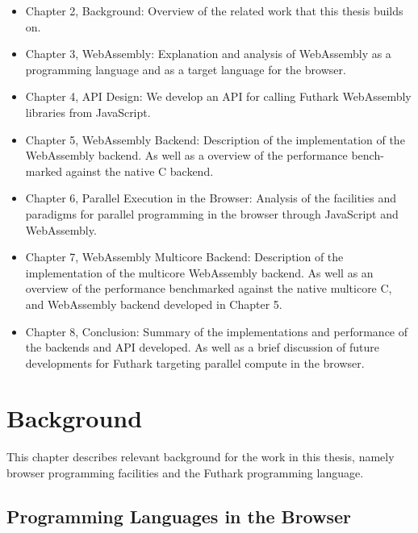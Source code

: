 \documentclass[11pt]{book}
\begin{document}
\begin{itemize}

\item Chapter 2, Background:
    Overview of the related work that this thesis builds on.

\item Chapter 3, WebAssembly:
    Explanation and analysis of WebAssembly as a programming language and as a target language for the browser. 

\item Chapter 4, API Design:
    We develop an API for calling Futhark Web\-Assembly libraries from JavaScript. 

\item Chapter 5, WebAssembly Backend:
    Description of the implementation of the WebAssembly backend. As well as a overview of the performance bench-marked against the native C backend.
    
\item Chapter 6, Parallel Execution in the Browser:
    Analysis of the facilities and paradigms for parallel programming in the browser through JavaScript and WebAssembly. 
    
\item Chapter 7, WebAssembly Multicore Backend:
    Description of the implementation of the multicore WebAssembly backend. As well as an overview of the performance benchmarked against the native multicore C, and WebAssembly backend developed in Chapter 5.
    
\item Chapter 8, Conclusion:
    Summary of the implementations and performance of the backends and API developed. As well as a brief discussion of future developments for Futhark targeting parallel compute in the browser.
    
\end{itemize}

\chapter{Background}

This chapter describes relevant background for the work in this thesis, namely browser programming facilities and the Futhark programming language.




\section{Programming Languages in the Browser}
\end{document}
